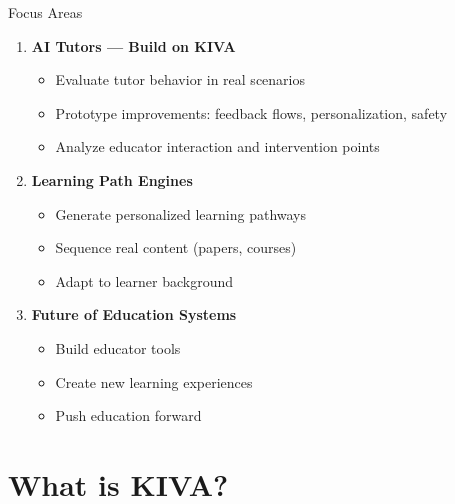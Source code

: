 \documentclass[aspectratio=169]{beamer}
\begin{document}
\begin{frame}{Focus Areas}
\begin{enumerate}
    \item \textbf{\textcolor{kivablue}{AI Tutors — Build on KIVA}}
    \begin{itemize}
        \item Evaluate tutor behavior in real scenarios
        \item Prototype improvements: feedback flows, personalization, safety
        \item Analyze educator interaction and intervention points
    \end{itemize}
    
    \vspace{0.3cm}
    
    \item \textbf{\textcolor{kivagreen}{Learning Path Engines}}
    \begin{itemize}
        \item Generate personalized learning pathways
        \item Sequence real content (papers, courses)
        \item Adapt to learner background
    \end{itemize}
    
    \vspace{0.3cm}
    
    \item \textbf{\textcolor{kivaorange}{Future of Education Systems}}
    \begin{itemize}
        \item Build educator tools
        \item Create new learning experiences
        \item Push education forward
    \end{itemize}
\end{enumerate}
\end{frame}

\section{What is KIVA?}
\end{document}
